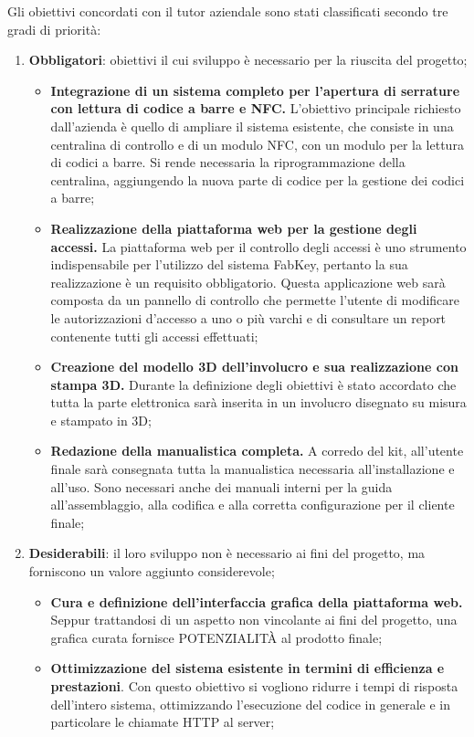 Gli obiettivi concordati con il tutor aziendale sono stati classificati secondo tre gradi di priorità:

\begin{enumerate}
\item \textbf{Obbligatori}: obiettivi il cui sviluppo è necessario per la riuscita del progetto;
\begin{itemize}
\item \textbf{Integrazione di un sistema completo per l'apertura di serrature con lettura di codice a barre e NFC.} L'obiettivo principale richiesto dall'azienda è quello di ampliare il sistema esistente, che consiste in una centralina di controllo e di un modulo NFC, con un modulo per la lettura di codici a barre. Si rende necessaria la riprogrammazione della centralina, aggiungendo la nuova parte di codice per la gestione dei codici a barre; 
\item \textbf{Realizzazione della piattaforma web per la gestione degli accessi.} La piattaforma web per il controllo degli accessi è uno strumento indispensabile per l'utilizzo del sistema FabKey, pertanto la sua realizzazione è un requisito obbligatorio. Questa applicazione web sarà composta da un pannello di controllo che permette l'utente di modificare le autorizzazioni d'accesso a uno o più varchi e di consultare un report contenente tutti gli accessi effettuati; 
\item \textbf{Creazione del modello 3D dell'involucro e sua realizzazione con stampa 3D.} Durante la definizione degli obiettivi è stato accordato che tutta la parte elettronica sarà inserita in un involucro disegnato su misura e stampato in 3D; 
\item \textbf{Redazione della manualistica completa.} A corredo del kit, all'utente finale sarà consegnata tutta la manualistica necessaria all'installazione e all'uso. Sono necessari anche dei manuali interni per la guida all'assemblaggio, alla codifica e alla corretta configurazione per il cliente finale;
\end{itemize}

\medskip

\item \textbf{Desiderabili}: il loro sviluppo non è necessario ai fini del progetto, ma forniscono un valore aggiunto considerevole;
\begin{itemize}
\item \textbf{Cura e definizione dell'interfaccia grafica della piattaforma web.} Seppur trattandosi di un aspetto non vincolante ai fini del progetto, una grafica curata fornisce POTENZIALITÀ al prodotto finale;
\item \textbf{Ottimizzazione del sistema esistente in termini di efficienza e prestazioni}. Con questo obiettivo si vogliono ridurre i tempi di risposta dell'intero sistema, ottimizzando l'esecuzione del codice in generale e in particolare le chiamate HTTP al server; 
\end{itemize}


\end{enumerate}
